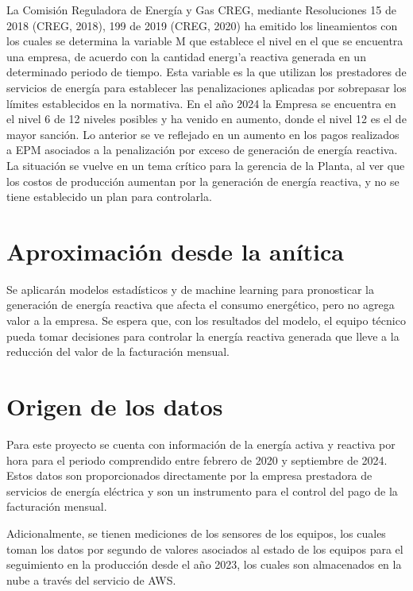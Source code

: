 La Comisi\'on Reguladora de Energ\'ia y Gas CREG, mediante Resoluciones 15 de 2018 (CREG, 2018), 199 de 2019 (CREG, 2020) ha emitido los lineamientos con los cuales se determina la variable M 
que establece el nivel en el que se encuentra una empresa, de acuerdo con la cantidad energ\i'a reactiva generada en un determinado periodo de tiempo.
Esta variable es la que utilizan los prestadores de servicios de energ\'ia para establecer las penalizaciones aplicadas por sobrepasar los l\'imites 
establecidos en la normativa. 
En el a\~no 2024 la Empresa se encuentra en el nivel 6 de 12 niveles posibles y ha venido en aumento, donde el nivel 12 es el de mayor sanci\'on. 
Lo anterior se ve reflejado en un aumento en los pagos realizados a EPM asociados a la penalizaci\'on por exceso de generaci\'on de energ\'ia reactiva.
La situaci\'on se vuelve en un tema cr\'itico para la gerencia de la Planta, al ver que los costos de producci\'on aumentan por la generaci\'on de energ\'ia reactiva, y no se tiene establecido un plan para controlarla.


\section{Aproximaci\'on desde la an\'itica}
Se aplicar\'an modelos estad\'isticos y de machine learning para pronosticar la generaci\'on de energ\'ia 
reactiva que afecta el consumo energ\'etico, pero no agrega valor a la empresa. 
Se espera que, con los resultados del modelo, el equipo t\'ecnico pueda tomar decisiones 
para controlar la energ\'ia reactiva generada que lleve a la reducci\'on del valor de la 
facturaci\'on mensual.


\section{Origen de los datos}
Para este proyecto se cuenta con informaci\'on de la energ\'ia activa y reactiva por hora para el periodo comprendido 
entre febrero de 2020 y septiembre de 2024. Estos datos son proporcionados directamente por la 
empresa prestadora de servicios de energ\'ia el\'ectrica y son un instrumento para el control del pago de la facturaci\'on 
mensual. 

Adicionalmente, se tienen mediciones de los sensores de los equipos, los cuales toman 
los datos por segundo de valores asociados al estado de los equipos para el seguimiento 
en la producci\'on desde el a\~no 2023, los cuales son almacenados en la nube a trav\'es 
del servicio de AWS.

